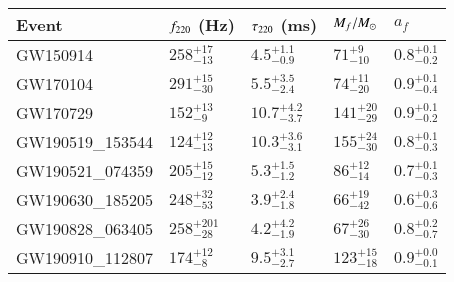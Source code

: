 
\begin{tabular}{lllll}
\toprule
Event & $f_{\text{220}}$ (Hz) & $\tau_{\text{220}}$ (ms) & $M_f/M_{\odot}$ & $a_f$ \\[0.075cm]
\midrule
\hline

GW150914 &
$258^{+17}_{-13}$ &
$4.5^{+1.1}_{-0.9}$ &
$71^{+9}_{-10}$ &
$0.8^{+0.1}_{-0.2}$
\\[0.075cm]

GW170104 &
$291^{+15}_{-30}$ &
$5.5^{+3.5}_{-2.4}$ &
$74^{+11}_{-20}$ &
$0.9^{+0.1}_{-0.4}$
\\[0.075cm]

GW170729 &
$152^{+13}_{-9}$ &
$10.7^{+4.2}_{-3.7}$ &
$141^{+20}_{-29}$ &
$0.9^{+0.1}_{-0.2}$
\\[0.075cm]

GW190519\_153544 &
$124^{+12}_{-13}$ &
$10.3^{+3.6}_{-3.1}$ &
$155^{+24}_{-30}$ &
$0.8^{+0.1}_{-0.3}$
\\[0.075cm]

GW190521\_074359 &
$205^{+15}_{-12}$ &
$5.3^{+1.5}_{-1.2}$ &
$86^{+12}_{-14}$ &
$0.7^{+0.1}_{-0.3}$
\\[0.075cm]

GW190630\_185205 &
$248^{+32}_{-53}$ &
$3.9^{+2.4}_{-1.8}$ &
$66^{+19}_{-42}$ &
$0.6^{+0.3}_{-0.6}$
\\[0.075cm]

GW190828\_063405 &
$258^{+201}_{-28}$ &
$4.2^{+4.2}_{-1.9}$ &
$67^{+26}_{-30}$ &
$0.8^{+0.2}_{-0.7}$
\\[0.075cm]

GW190910\_112807 &
$174^{+12}_{-8}$ &
$9.5^{+3.1}_{-2.7}$ &
$123^{+15}_{-18}$ &
$0.9^{+0.0}_{-0.1}$
\\[0.075cm]

\bottomrule
\end{tabular}
